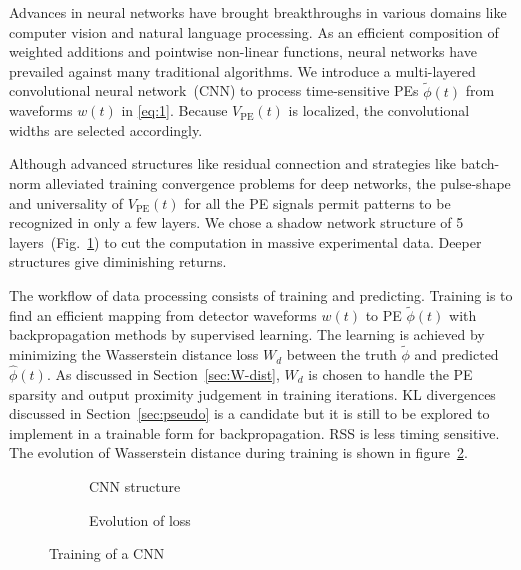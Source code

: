 Advances in neural networks have brought breakthroughs in various domains like computer vision and natural language processing. As an efficient composition of weighted additions and pointwise non-linear functions, neural networks have prevailed against many traditional algorithms. We introduce a multi-layered convolutional neural network~(CNN) to process time-sensitive PEs $\tilde{\phi}(t)$ from waveforms $w(t)$ in \eqref{eq:1}.  Because $V_\mathrm{PE}(t)$ is localized, the convolutional widths are selected accordingly.

Although advanced structures like residual connection and strategies like batch-norm alleviated training convergence problems for deep networks, the pulse-shape and universality of $V_\mathrm{PE}(t)$ for all the PE signals permit patterns to be recognized in only a few layers.  We chose a shadow network structure of 5 layers~(Fig.~\ref{fig:struct}) to cut the computation in massive experimental data.  Deeper structures give diminishing returns.

The workflow of data processing consists of training and predicting. Training is to find an efficient mapping from detector waveforms $w(t)$ to PE $\tilde{\phi}(t)$ with backpropagation methods by supervised learning.  The learning is achieved by minimizing the Wasserstein distance loss $W_d$ between the truth $\tilde{\phi}$ and predicted $\hat{\phi}(t)$.  As discussed in Section~\ref{sec:W-dist}, $W_d$ is chosen to handle the PE sparsity and output proximity judgement in training iterations.  KL divergences discussed in Section~\ref{sec:pseudo} is a candidate but it is still to be explored to implement in a trainable form for backpropagation.  RSS is less timing sensitive.  The evolution of Wasserstein distance during training is shown in figure~\ref{fig:loss}.

\begin{figure}[H]
  \begin{subfigure}{0.35\textwidth}
    \centering
    \begin{adjustbox}{width=0.65\textwidth}
      
    \end{adjustbox}
    \caption{\label{fig:struct} CNN structure}
  \end{subfigure}
  \begin{subfigure}{0.6\textwidth}
    \centering
    \resizebox{\textwidth}{!}{}
    \caption{\label{fig:loss} Evolution of loss}
  \end{subfigure}
  \caption{\label{fig:CNN} Training of a CNN}
\end{figure}

